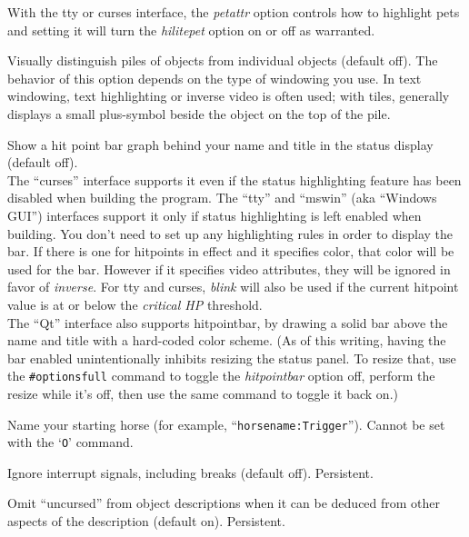 \documentclass[titlepage]{article}
\begin{document}
\begin{description}[font=\mdseries\itshape]
With the tty or curses interface, the \textit{petattr}
option controls how to highlight pets and setting it will turn the
\textit{hilite\textunderscore pet} option on or off as warranted.
\item[hilite\textunderscore pile]
Visually distinguish piles of objects from individual objects (default off).
The behavior of this option depends on the type of windowing you use.
In text windowing, text highlighting or inverse video is often used;
with tiles, generally displays a small plus-symbol beside the object
on the top of the pile.
\item[hitpointbar]
Show a hit point bar graph behind your name and title in the status
display (default off).
\\
The ``curses'' interface supports it even if the status highlighting
feature has been disabled when building the program.
The ``tty'' and ``mswin'' (aka ``Windows GUI'') interfaces
support it only if status highlighting is left enabled when building.
You don't need to set up any highlighting rules in order to display
the bar.
If there is one for hitpoints in effect and it specifies color, that
color will be used for the bar.
However if it specifies video attributes, they will be ignored in
favor of \textit{inverse}.
For tty and curses, \textit{blink} will also be used if the current
hitpoint value is at or below the \textit{critical HP} threshold.
\\
The ``Qt'' interface also supports hitpointbar, by drawing
a solid bar above the name and title with a hard-coded color scheme.
(As of this writing, having the bar enabled unintentionally inhibits
resizing the status panel.
To resize that, use the \texttt{\#optionsfull} command to toggle the
\textit{hitpointbar} option off, perform the resize while it's off, then
use the same command to toggle it back on.)
\item[horsename]
Name your starting horse (for example, ``\texttt{horsename:Trigger}'').
Cannot be set with the `\texttt{O}' command.
\item[ignintr]
Ignore interrupt signals, including breaks (default off).  Persistent.
\item[implicit\textunderscore uncursed]
Omit ``uncursed'' from object descriptions when it can be deduced from
other aspects of the description (default on).
Persistent.


\end{description}
\end{document}
